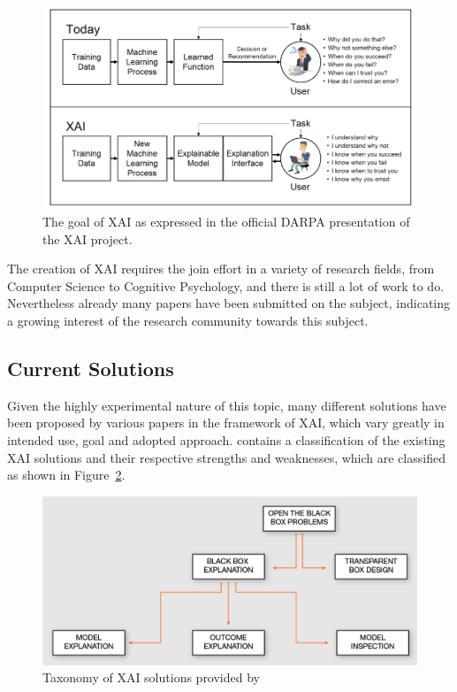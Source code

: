 \documentclass[conference]{IEEEtran}
\newcommand{\cit}[1][]{\todo[tickmarkheight=0.2cm]{cit #1}}
\begin{document}
\begin{figure}[h!] \includegraphics[width=\linewidth]{images/xai.png}
    \caption{The goal of XAI as expressed in the official DARPA presentation of the XAI project. } \label{fig:xai} \end{figure}

The creation of XAI requires the join effort in a variety of research fields,
from Computer Science to Cognitive Psychology, and there is still a lot of work
to do. Nevertheless already many papers have been submitted on the subject,
indicating a growing interest of the research community towards this subject.

\subsection{Current Solutions}
\label{sec:solutions}

Given the highly experimental nature of this topic, many different solutions
have been proposed by various papers in the framework of XAI, which vary greatly
in intended use, goal and adopted approach. \cit contains a classification of the existing XAI
solutions and their respective strengths and weaknesses, which are classified as shown in Figure~\ref{fig:xaiclass}.

\begin{figure}[h!] \includegraphics[width=\linewidth]{images/xaiclass.png}
    \caption{Taxonomy of XAI solutions provided by } \label{fig:xaiclass} \end{figure}
\end{document}
